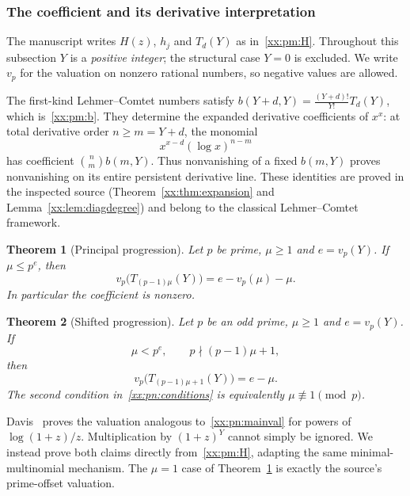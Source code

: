 \documentclass[11pt,a4paper]{article}
\numberwithin{equation}{section}
\newtheorem{theorem}{Theorem}[section]
\theoremstyle{definition}
\theoremstyle{remark}
\theoremstyle{plain}
\begin{document}
\subsubsection{The coefficient and its derivative interpretation}

The manuscript writes $H(z)$, $h_j$ and $T_d(Y)$ as in~\eqref{xx:pm:H}.
Throughout this subsection $Y$ is a \emph{positive integer}; the structural case
$Y=0$ is excluded. We write $v_p$ for the valuation on nonzero rational numbers,
so negative values are allowed.

The first-kind Lehmer--Comtet numbers satisfy
$b(Y+d,Y)=\frac{(Y+d)!}{Y!}T_d(Y)$, which is~\eqref{xx:pm:b}.  They determine
the expanded derivative coefficients of $x^x$: at total derivative order
$n\ge m=Y+d$, the monomial
\[
 x^{x-d}(\log x)^{n-m}
\]
has coefficient $\binom nm b(m,Y)$. Thus nonvanishing of a fixed $b(m,Y)$
proves nonvanishing on its entire persistent derivative line. These identities
are proved in the inspected source (Theorem~\ref{xx:thm:expansion} and
Lemma~\ref{xx:lem:diagdegree}) and belong to the classical Lehmer--Comtet
framework.

\begin{theorem}[Principal progression]\label{xx:pn:principal}
Let $p$ be prime, $\mu\ge1$ and $e=v_p(Y)$. If $\mu\le p^e$, then
\begin{equation}\label{xx:pn:mainval}
 v_p\bigl(T_{(p-1)\mu}(Y)\bigr)=e-v_p(\mu)-\mu.
\end{equation}
In particular the coefficient is nonzero.
\end{theorem}

\begin{theorem}[Shifted progression]\label{xx:pn:shifted}
Let $p$ be an odd prime, $\mu\ge1$ and $e=v_p(Y)$. If
\begin{equation}\label{xx:pn:conditions}
 \mu<p^e,\qquad p\nmid (p-1)\mu+1,
\end{equation}
then
\begin{equation}\label{xx:pn:shiftval}
 v_p\bigl(T_{(p-1)\mu+1}(Y)\bigr)=e-\mu.
\end{equation}
The second condition in~\eqref{xx:pn:conditions} is equivalently
$\mu\not\equiv1\pmod p$.
\end{theorem}

Davis~\cite[Theorem 1.1]{xx-davis} proves the valuation analogous
to~\eqref{xx:pn:mainval} for powers of $\log(1+z)/z$. Multiplication by
$(1+z)^Y$ cannot simply be ignored. We instead prove both claims directly
from~\eqref{xx:pm:H}, adapting the same minimal-multinomial mechanism. The
$\mu=1$ case of Theorem~\ref{xx:pn:principal} is exactly the source's
prime-offset valuation.
\end{document}
